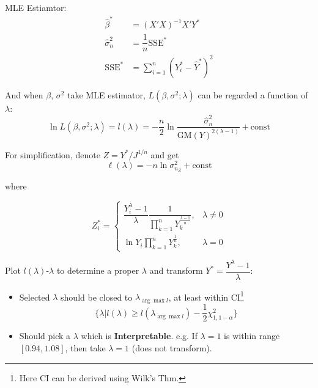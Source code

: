\begin{itemize}[topsep=2pt,itemsep=2pt]
            
    
            MLE Estiamtor:
            \begin{align*}
                \hat{\beta }^*&= (X'X)^{-1}X'Y^*\\
                \hat{\sigma }^2_n&=\dfrac{1}{n}\mathrm{SSE}^*\\
                \mathrm{SSE}^*&=\sum_{i=1}^n(Y_i^*-\hat{Y}^*)^2
            \end{align*}
    
            And when $ \beta  $, $ \sigma ^2 $ take MLE estimator, $ L(\beta ,\sigma ^2;\lambda ) $ can be regarded a function of $ \lambda  $:
            \begin{equation}
                \ln L(\beta ,\sigma ^2;\lambda )=l(\lambda )=-\dfrac{n}{2}\ln \dfrac{\hat{\sigma}^2_n}{\mathrm{GM}(Y)^{2(\lambda -1)}}+\mathrm{const}
            \end{equation}
    
            For simplification, denote $ Z=Y^*/J^{1/n} $ and get
            \begin{equation}
                \ell (\lambda )=-n\ln \sigma^2_{n_Z}+\mathrm{const} 
            \end{equation}
            
            where 
    
            \begin{equation}
                Z_i^* =\begin{cases}
                    \dfrac{Y_i^\lambda-1 }{\lambda }\dfrac{1}{\prod\limits_{k=1}^n Y_k^{\frac{\lambda -1}{n}}},&\lambda \neq 0\\
                    \ln Y_i\prod\limits_{k=1}^n Y_k^{\frac{1}{n}},&\lambda =0
                \end{cases}
            \end{equation}
    
            Plot $ l(\lambda ) $-$ \lambda  $ to determine a proper $ \lambda  $ and transform $ Y^*=\dfrac{Y^\lambda -1}{\lambda } $:
            \begin{itemize}[topsep=2pt,itemsep=2pt]
                \item Selected $ \lambda $ should be closed to $ \lambda_{\arg\max l} $, at least within CI\footnote{Here CI can be derived using Wilk's Thm.}
                \begin{equation}
                    \{\lambda |l(\lambda )\geq l(\lambda_{\arg\max l})-\dfrac{1}{2}\chi^2_{1,1-\alpha }\}
                \end{equation}
                \item Should pick a $ \lambda  $ which is \textbf{Interpretable}. e.g. If $ \lambda =1 $ is within range $ [0.94,1.08] $, then take $ \lambda =1 $ (does not transform).
                

\end{itemize}
\end{itemize}
